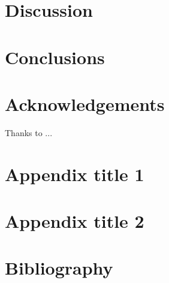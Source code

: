 \documentclass[final,times,twocolumn,article]{elsarticle}
\begin{document}
\section{Discussion}


\section{Conclusions}


\section*{Acknowledgements}
Thanks to ...

\appendix

\section{Appendix title 1}

\section{Appendix title 2}


\section{Bibliography}
 

\end{document}
